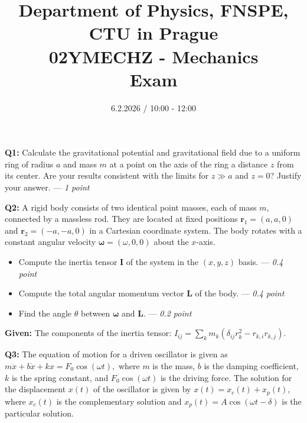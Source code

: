 \documentclass[a4paper,12pt]{article}
\title{{\large Department of Physics, FNSPE, CTU in Prague} \\
                  02YMECHZ - Mechanics \\ 
          {\Large \textbf{Exam}}\vspace{-1cm}}
\date{6.2.2026 / 10:00 - 12:00}
\author{}
\begin{document}
\maketitle

\textbf{Q1:} Calculate the gravitational potential and gravitational field due to a uniform ring of radius $a$ and mass $m$ at a point on the axis of the ring a distance $z$ from its center. Are your results consistent with the limits for $z\gg a$ and $z = 0$? Justify your answer. --- \textit{1 point}

\vspace*{0.1cm}
\textbf{Q2:} A rigid body consists of two identical point masses, each of mass $m$, connected by a massless rod. They are located at fixed positions $\mathbf{r}_1 = (a, a, 0)$ and $\mathbf{r}_2 = (-a, -a, 0)$ in a Cartesian coordinate system. The body rotates with a constant angular velocity $\boldsymbol{\omega} = (\omega, 0, 0)$ about the $x$-axis.

\begin{itemize}
    \item[\textbf{a.}] Compute the inertia tensor $\mathbf{I}$ of the system in the $(x,y,z)$ basis. --- \textit{0.4 point}
    \item[\textbf{b.}] Compute the total angular momentum vector $\mathbf{L}$ of the body. --- \textit{0.4 point}
    \item[\textbf{c.}] Find the angle $\theta$ between $\boldsymbol{\omega}$ and $\mathbf{L}$. --- \textit{0.2 point}
\end{itemize}
\textbf{Given:} The components of the inertia tensor: $I_{ij} = \sum_k m_k\left(\delta_{ij} r_k^2 - r_{k,i} r_{k,j}\right)$.

\vspace*{0.1cm}
\textbf{Q3:} The equation of motion for a driven oscillator is given as $m \ddot{x} + b \dot{x} + k x = F_0 \cos(\omega t),$ where $m$ is the mass, $b$ is the damping coefficient, $k$ is the spring constant, and $F_0 \cos(\omega t)$ is the driving force. The solution for the displacement $x(t)$ of the oscillator is given by $x(t) = x_c(t) + x_p(t)$, where $x_c(t)$ is the complementary solution and $x_p(t) = A \cos(\omega t - \delta)$ is the particular solution. 
\end{document}
